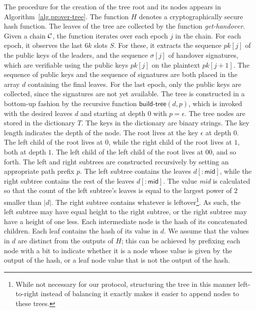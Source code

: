 The procedure for the creation of the tree root and its nodes appears in Algorithm~\ref{alg.prover-tree}.
The function $H$ denotes a cryptographically secure hash function.
The leaves of the tree are collected by the function \emph{get-handover}. Given a chain $\mathcal{C}$,
the function iterates over each epoch $j$ in the chain. For each epoch, it observes the last $6k$ slots $S$.
For these, it extracts the sequence $pk[j]$ of the public keys of the leaders,
and the sequence $\sigma[j]$ of handover signatures,
which are verifiable using the public keys $pk[j]$ on the plaintext $pk[j+1]$. The sequence of public keys
and the sequence of signatures are both placed in
the array $d$ containing the final leaves. For the last epoch, only the public keys are collected,
since the signatures are not yet available.
The tree is constructed in a bottom-up fashion by the recursive function $\textsf{build-tree}(d, p)$,
which is invoked with the desired leaves $d$ and starting at depth $0$ with $p = \epsilon$.
The tree nodes are stored in the dictionary $T$. The keys in the dictionary are binary strings.
The key length indicates the depth of the node. The root lives at the key $\epsilon$ at depth $0$.
The left child of the root lives at $0$, while the right child of the root lives at $1$, both at depth $1$.
The left child of the left child of the root lives at $00$, and so forth. The left and right subtrees
are constructed recursively by setting an appropriate path prefix $p$. The left subtree contains
the leaves $d[{:}\textsf{mid}]$, while the right subtree contains the rest of the leaves
$d[{:}\textsf{mid}]$. The value \emph{mid} is calculated so that the count of the left subtree's leaves
is equal to the largest power of $2$ smaller than $|d|$. The right subtree contains whatever is
leftover\footnote{While not necessary for our protocol, structuring the tree in this manner
left-to-right instead of balancing it exactly makes it easier to append nodes to these trees\cite{ct}.}.
As such, the left subtree may have equal height to the right subtree, or the right subtree may have
a height of one less. Each intermediate node is the hash of its concatenated children.
Each leaf contains the hash of its value in $d$. We assume that the values in $d$ are distinct from
the outputs of $H$; this can be achieved by prefixing each node with a bit to indicate whether it
is a node whose value is given by the output of the hash, or a leaf node value that is not the output
of the hash.
